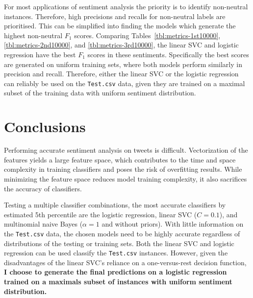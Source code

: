 \documentclass[11pt]{article}
\begin{document}
For most applications of sentiment analysis the priority is to identify non-neutral instances.
Therefore, high precisions and recalls for non-neutral labels are prioritised.
This can be simplified into finding the models which generate the highest non-neutral $F_1$ scores.
Comparing Tables~\ref{tbl:metrics-1st10000}, \ref{tbl:metrics-2nd10000}, and \ref{tbl:metrics-3rd10000}, 
the linear SVC and logistic regression have the best $F_1$ scores in these sentiments.
Specifically the best scores are generated on uniform training sets, where both models perform similarly in precision and recall.
Therefore, either the linear SVC or the logistic regression can reliably be used on the \texttt{Test.csv} data,
given they are trained on a maximal subset of the training data with uniform sentiment distribution.

\pagebreak
\section{Conclusions}

Performing accurate sentiment analysis on tweets is difficult.
Vectorization of the features yields a large feature space, 
which contributes to the time and space complexity in training classifiers and poses the risk of overfitting results.
While minimizing the feature space reduces model training complexity, it also sacrifices the accuracy of classifiers.

Testing a multiple classifier combinations, 
the most accurate classifiers by estimated 5th percentile are the logistic regression, 
linear SVC ($C=0.1$), and multinomial naive Bayes ($\alpha=1$ and without priors).
With little information on the \texttt{Test.csv} data, 
the chosen models need to be highly accurate regardless of distributions of the testing or training sets.
Both the linear SVC and logistic regression can be used classify the \texttt{Test.csv} instances.
However, given the disadvantages of the linear SVC's reliance on a one-versus-rest decision function,
\textbf{I choose to generate the final predictions on a logistic regression trained on a maximals subset of instances with uniform sentiment distribution.}
\vfill
\pagebreak



\end{document}
